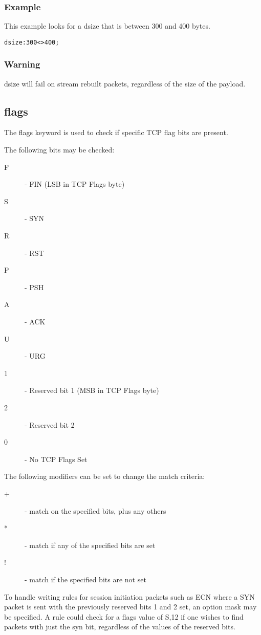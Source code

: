 \documentclass[english]{report}
\begin{document}
\subsubsection{Example}
This example looks for a dsize that is between 300 and 400 bytes.
\begin{verbatim}
dsize:300<>400;
\end{verbatim}

\subsubsection{Warning}
dsize will fail on stream rebuilt packets, regardless of the size of the
payload.

\subsection{flags}

The flags keyword is used to check if specific TCP flag bits are present.

The following bits may be checked:
\begin{description}
\item [F] - FIN (LSB in TCP Flags byte)
\item [S] - SYN 
\item [R] - RST 
\item [P] - PSH 
\item [A] - ACK 
\item [U] - URG 
\item [1] - Reserved bit 1 (MSB in TCP Flags byte)
\item [2] - Reserved bit 2 
\item [0] - No TCP Flags Set
\end{description}

The following modifiers can be set to change the match criteria:
\begin{description}
\item [+] - match on the specified bits, plus any others
\item [*] - match if any of the specified bits are set
\item [!] - match if the specified bits are not set
\end{description}

To handle writing rules for session initiation packets such as ECN where a SYN
packet is sent with the previously reserved bits 1 and 2 set, an option mask
may be specified. A rule could check for a flags value of S,12 if one wishes to
find packets with just the syn bit, regardless of the values of the reserved
bits.
\end{document}
